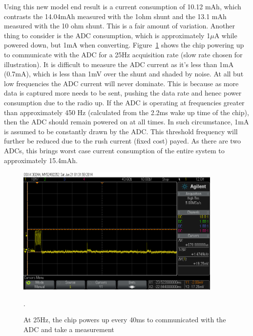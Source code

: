 \documentclass[]{article}
\begin{document}
Using this new model end result is a current consumption of 10.12 mAh, which contrasts the 14.04mAh measured with the 1ohm shunt and the 13.1 mAh measured with the 10 ohm shunt. This is a fair amount of variation. Another thing to consider is the \ac{ADC} consumption, which is approximately 1$\mu$A while powered down, but 1mA when converting. Figure~\ref{fig:adcpower} shows the chip powering up to communicate with the \ac{ADC} for a 25Hz acquisition rate (slow rate chosen for illustration). It is difficult to measure the \ac{ADC} current as it's less than 1mA (0.7mA), which is less than 1mV over the shunt and shaded by noise. At all but low frequencies the \ac{ADC} current will never dominate. This is because as more data is captured more needs to be sent, pushing the data rate and henec power consumption due to the radio up. If the \ac{ADC} is operating at frequencies greater than approximately 450 Hz (calculated from the 2.2ms wake up time of the chip), then the \ac{ADC} should remain powered on at all times. In such circumstance, 1mA is assumed to be constantly drawn by the \ac{ADC}. This threshold frequency will further be reduced due to the rush current (fixed cost) payed. As there are two \ac{ADC}s, this brings worst case current consumption of the entire system to approximately 15.4mAh.

\begin{figure}[H]
	\begin{center}
		\includegraphics[width = 0.9\textwidth]{adcpower}
	\end{center}
	\caption{At 25Hz, the chip powers up every 40ms to communicated with the \ac{ADC} and take a measurement}. 
	\label{fig:adcpower}
\end{figure}

\end{document}

